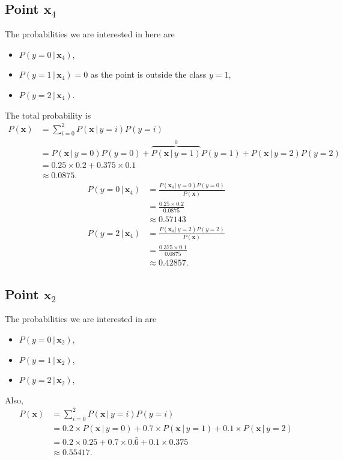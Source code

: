 \documentclass[10pt]{article}
\begin{document}
\subsection*{Point $\textbf{x}_4$}
The probabilities we are interested in here are
\begin{itemize}
  \item $P(y = 0 \, | \, \textbf{x}_4)$,
  \item $P(y = 1 \, | \, \textbf{x}_4) = 0$ as the point is outside the class $y = 1$,
  \item $P(y = 2 \, | \, \textbf{x}_4)$.
\end{itemize}
The total probability is
\begin{align*}
P(\textbf{x}) &= \sum_{i = 0}^2 P(\textbf{x} \, | \, y = i)P(y = i) \\
                    &= P(\textbf{x} \, | \, y = 0) P(y = 0) + \overbrace{P(\textbf{x} \, | \, y = 1)}^0 P(y = 1) + P(\textbf{x} \, | \, y = 2)P(y = 2) \\
                    &= 0.25 \times 0.2 + 0.375 \times 0.1 \\
                    &\approx 0.0875.
\end{align*}
\begin{align*}
P(y = 0 \, | \, \textbf{x}_4) &= \frac{ P( \textbf{x}_4 \, | \, y = 0)P(y = 0)}{ P(\textbf{x}) } \\
                                          &= \frac{ 0.25 \times 0.2}{0.0875} \\
                                          &\approx 0.57143 \\
P(y = 2 \, | \, \textbf{x}_4) &= \frac{P(\textbf{x}_4 \, | \, y = 2)P(y = 2)}{ P(\textbf{x}) } \\
                                          &= \frac{0.375 \times 0.1}{0.0875} \\
                                          &\approx 0.42857. 
\end{align*}
\subsection*{Point $\textbf{x}_2$}
The probabilities we are interested in are
\begin{itemize}
 \item $P(y = 0 \, | \, \textbf{x}_2)$,
 \item $P(y = 1 \, | \, \textbf{x}_2)$,
 \item $P(y = 2 \, | \, \textbf{x}_2)$,
\end{itemize}
Also,
\begin{align*}
P(\textbf{x}) &= \sum_{i = 0}^2 P(\textbf{x} \, | \, y = i) P(y = i) \\
                    &= 0.2 \times P(\textbf{x} \, | \,  y = 0) + 0.7 \times P(\textbf{x} \, | \, y = 1) + 0.1 \times P(\textbf{x} \, | \, y = 2) \\
                    &= 0.2 \times 0.25 + 0.7 \times 0.\bar{6} + 0.1 \times 0.375 \\
                    &\approx 0.55417.
\end{align*}
\end{document}
